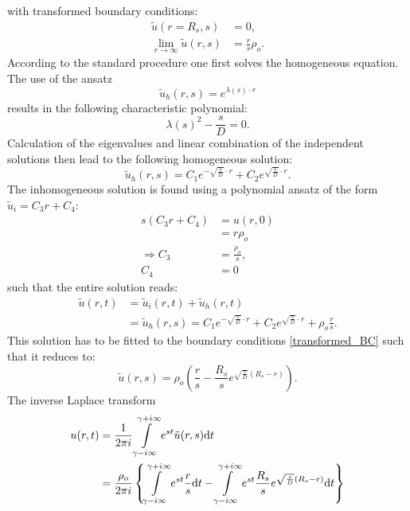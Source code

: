 with transformed boundary conditions:
\begin{align}
    \tilde{u}(r=R_s,s) &= 0, \nonumber \\
    \lim\limits_{r\rightarrow \infty} \tilde{u}(r,s) &= \frac{r}{s}\rho_o.
    \label{transformed_BC}
\end{align}
According to the standard procedure one first solves the homogeneous equation. The use of the ansatz
\begin{equation}
    \tilde{u}_{h}(r,s) = e^{\lambda(s) \cdot r}
\end{equation}
results in the following characteristic polynomial:
\begin{equation}
    \lambda(s) ^2 - \frac{s}{D} = 0.
    \label{characteristic_polynomial}
\end{equation}
Calculation of the eigenvalues and linear combination of the independent solutions then lead to the following homogeneous solution:
\begin{equation}
    \tilde{u}_h(r,s) = C_1 e^{ - \sqrt{\frac{s}{D}} \cdot r } + C_2 e^{ \sqrt{\frac{s}{D}} \cdot r }.
    \label{u_h}
\end{equation}
The inhomogeneous solution is found using a polynomial ansatz of the form $\tilde{u}_i = C_3 r + C_4$:
\begin{align}
    s(C_3 r + C_4)  &= u(r,0)\nonumber\\
                    &= r \rho_o \nonumber\\
    \Rightarrow C_3 &= \frac{\rho_o}{s}, \nonumber\\
                C_4 &= 0
\end{align}
such that the entire solution reads:
\begin{align}
    \tilde{u}(r,t)&=\tilde{u}_{i}(r,t)+\tilde{u}_{h}(r,t) \nonumber \\
    &= \tilde{u}_h(r,s) = C_1 e^{ - \sqrt{\frac{s}{D}} \cdot r } + C_2 e^{ \sqrt{\frac{s}{D}} \cdot r } + \rho_o\frac{r}{s} .
\end{align}
This solution has to be fitted to the boundary conditions \eqref{transformed_BC} such that it reduces to:
\begin{equation}
    \tilde{u}(r,s) = \rho_o \left( \frac{r}{s} - \frac{R_s}{s} e^{ \sqrt{\frac{s}{D}}(R_s - r) } \right) .
\end{equation}
The inverse Laplace transform
\begin{align}
    u(r,t)  &= \frac{1}{2 \pi i} \int\limits_{\gamma - i \infty}^{\gamma + i \infty}  e^{st} \tilde{u}(r,s){\rm d}t \\
    &= \frac{\rho_o}{ 2 \pi i} \left\{  \int\limits_{\gamma - i \infty}^{\gamma + i \infty}e^{st} \frac{r}{s}   {\rm d}t -  \int\limits_{\gamma - i \infty}^{\gamma + i \infty}  e^{st} \frac{R_s}{s} e^{ \sqrt{\frac{s}{D}}(R_s - r) }  {\rm d}t \right\}
    \label{inverse laplace}
\end{align}
